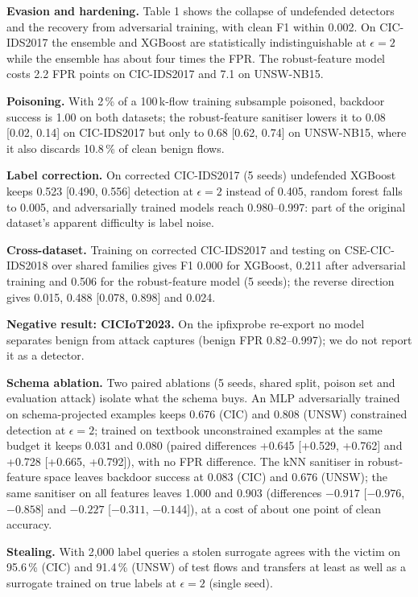 \documentclass[11pt]{article}
\begin{document}
\textbf{Evasion and hardening.} Table 1 shows the collapse of undefended detectors and the recovery
from adversarial training, with clean F1 within 0.002. On CIC-IDS2017 the ensemble and XGBoost are
statistically indistinguishable at $\epsilon=2$ while the ensemble has about four times the FPR.
The robust-feature model costs 2.2 FPR points on CIC-IDS2017 and 7.1 on UNSW-NB15.

\textbf{Poisoning.} With 2\,\% of a 100\,k-flow training subsample poisoned, backdoor success is
1.00 on both datasets; the robust-feature sanitiser lowers it to 0.08 [0.02, 0.14] on CIC-IDS2017
but only to 0.68 [0.62, 0.74] on UNSW-NB15, where it also discards 10.8\,\% of clean benign flows.

\textbf{Label correction.} On corrected CIC-IDS2017 (5 seeds) undefended XGBoost keeps 0.523
[0.490, 0.556] detection at $\epsilon=2$ instead of 0.405, random forest falls to 0.005, and
adversarially trained models reach 0.980--0.997: part of
the original dataset's apparent difficulty is label noise.

\textbf{Cross-dataset.} Training on corrected CIC-IDS2017 and testing on CSE-CIC-IDS2018 over shared
families gives F1 0.000 for XGBoost, 0.211 after adversarial training and 0.506 for the
robust-feature model (5 seeds); the reverse direction gives 0.015, 0.488 [0.078, 0.898] and 0.024.

\textbf{Negative result: CICIoT2023.} On the ipfixprobe re-export no model separates benign from
attack captures (benign FPR 0.82--0.997); we do not report it as a detector.

\textbf{Schema ablation.} Two paired ablations (5 seeds, shared split, poison set and evaluation
attack) isolate what the schema buys. An MLP adversarially trained on schema-projected examples keeps
0.676 (CIC) and 0.808 (UNSW) constrained detection at $\epsilon=2$; trained on textbook
unconstrained examples at the same budget it keeps 0.031 and 0.080 (paired differences +0.645
[+0.529, +0.762] and +0.728 [+0.665, +0.792]), with no FPR difference. The kNN sanitiser in
robust-feature space leaves backdoor success at 0.083 (CIC) and 0.676 (UNSW); the same sanitiser on
all features \cite{paudice2018} leaves 1.000 and 0.903 (differences $-0.917$ [$-0.976$, $-0.858$] and
$-0.227$ [$-0.311$, $-0.144$]), at a cost of about one point of clean accuracy.

\textbf{Stealing.} With 2{,}000 label queries a stolen surrogate agrees with the victim on 95.6\,\%
(CIC) and 91.4\,\% (UNSW) of test flows and transfers at least as well as a surrogate trained on
true labels at $\epsilon=2$ (single seed).
\end{document}
